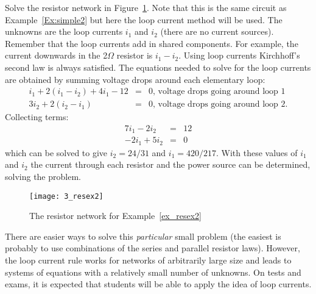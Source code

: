 \begin{example} 
\label{ex_resex2}
Solve the resistor network in Figure~\ref{fig_resex2}. Note that this is the same 
circuit as Example~\ref{Ex:simple2} but here the loop current method 
will be used. 
{\rm The unknowns are the loop currents 
$i_1$ and $i_2$ (there are no current sources). 
Remember that the loop currents add in shared components. For example, 
the current downwards in the 2$\Omega$ resistor is $i_1-i_2$. Using 
loop currents Kirchhoff's second law is always satisfied. The equations 
needed to solve for the loop currents are obtained by summing 
voltage drops around each elementary loop:
\begin{eqnarray*}
i_1 + 2(i_1-i_2) + 4i_1 - 12 & = & 0 
   \mbox{,\ \ voltage drops going around loop 1} \\
3i_2 + 2(i_2 - i_1) & = & 0 
   \mbox{,\ \ voltage drops going around loop 2.} 
\end{eqnarray*}
Collecting terms:
\begin{eqnarray*}
7 i_1 - 2i_2 & = & 12 \\
-2i_1 + 5i_2 & = & 0 
\end{eqnarray*}
which can be solved to give $i_2 = 24/31$ and $i_1 = 420/217$. With 
these values of $i_1$ and $i_2$ the current through each resistor 
and the power source can be determined, solving the problem. }
\end{example}

\begin{figure}
\centerline{\texttt{[image: 3\_resex2]}}
\caption{The resistor network for Example~\ref{ex_resex2}
\label{fig_resex2}}
\end{figure}

There are easier ways to solve this {\em particular} small problem (the 
easiest is probably to use combinations of the series and parallel 
resistor laws). However, the loop current rule works for networks 
of arbitrarily large size and leads to systems of equations with a 
relatively small number of unknowns. On tests and exams, it is expected 
that students will be able to apply the idea of loop currents. 

